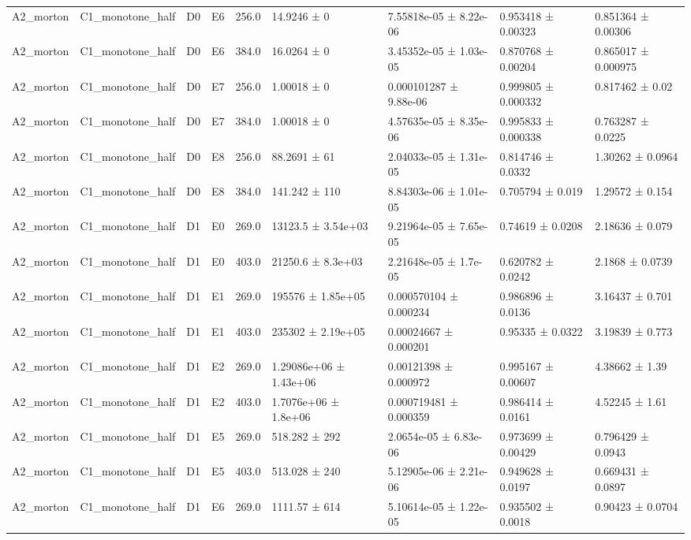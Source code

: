 \begin{table}
\begin{tabular}{lllllllll}
A2\_morton & C1\_monotone\_half & D0 & E6 & 256.0 & 14.9246 ± 0 & 7.55818e-05 ± 8.22e-06 & 0.953418 ± 0.00323 & 0.851364 ± 0.00306 \\
A2\_morton & C1\_monotone\_half & D0 & E6 & 384.0 & 16.0264 ± 0 & 3.45352e-05 ± 1.03e-05 & 0.870768 ± 0.00204 & 0.865017 ± 0.000975 \\
A2\_morton & C1\_monotone\_half & D0 & E7 & 256.0 & 1.00018 ± 0 & 0.000101287 ± 9.88e-06 & 0.999805 ± 0.000332 & 0.817462 ± 0.02 \\
A2\_morton & C1\_monotone\_half & D0 & E7 & 384.0 & 1.00018 ± 0 & 4.57635e-05 ± 8.35e-06 & 0.995833 ± 0.000338 & 0.763287 ± 0.0225 \\
A2\_morton & C1\_monotone\_half & D0 & E8 & 256.0 & 88.2691 ± 61 & 2.04033e-05 ± 1.31e-05 & 0.814746 ± 0.0332 & 1.30262 ± 0.0964 \\
A2\_morton & C1\_monotone\_half & D0 & E8 & 384.0 & 141.242 ± 110 & 8.84303e-06 ± 1.01e-05 & 0.705794 ± 0.019 & 1.29572 ± 0.154 \\
A2\_morton & C1\_monotone\_half & D1 & E0 & 269.0 & 13123.5 ± 3.54e+03 & 9.21964e-05 ± 7.65e-05 & 0.74619 ± 0.0208 & 2.18636 ± 0.079 \\
A2\_morton & C1\_monotone\_half & D1 & E0 & 403.0 & 21250.6 ± 8.3e+03 & 2.21648e-05 ± 1.7e-05 & 0.620782 ± 0.0242 & 2.1868 ± 0.0739 \\
A2\_morton & C1\_monotone\_half & D1 & E1 & 269.0 & 195576 ± 1.85e+05 & 0.000570104 ± 0.000234 & 0.986896 ± 0.0136 & 3.16437 ± 0.701 \\
A2\_morton & C1\_monotone\_half & D1 & E1 & 403.0 & 235302 ± 2.19e+05 & 0.00024667 ± 0.000201 & 0.95335 ± 0.0322 & 3.19839 ± 0.773 \\
A2\_morton & C1\_monotone\_half & D1 & E2 & 269.0 & 1.29086e+06 ± 1.43e+06 & 0.00121398 ± 0.000972 & 0.995167 ± 0.00607 & 4.38662 ± 1.39 \\
A2\_morton & C1\_monotone\_half & D1 & E2 & 403.0 & 1.7076e+06 ± 1.8e+06 & 0.000719481 ± 0.000359 & 0.986414 ± 0.0161 & 4.52245 ± 1.61 \\
A2\_morton & C1\_monotone\_half & D1 & E5 & 269.0 & 518.282 ± 292 & 2.0654e-05 ± 6.83e-06 & 0.973699 ± 0.00429 & 0.796429 ± 0.0943 \\
A2\_morton & C1\_monotone\_half & D1 & E5 & 403.0 & 513.028 ± 240 & 5.12905e-06 ± 2.21e-06 & 0.949628 ± 0.0197 & 0.669431 ± 0.0897 \\
A2\_morton & C1\_monotone\_half & D1 & E6 & 269.0 & 1111.57 ± 614 & 5.10614e-05 ± 1.22e-05 & 0.935502 ± 0.0018 & 0.90423 ± 0.0704 \\

\end{tabular}
\end{table}

